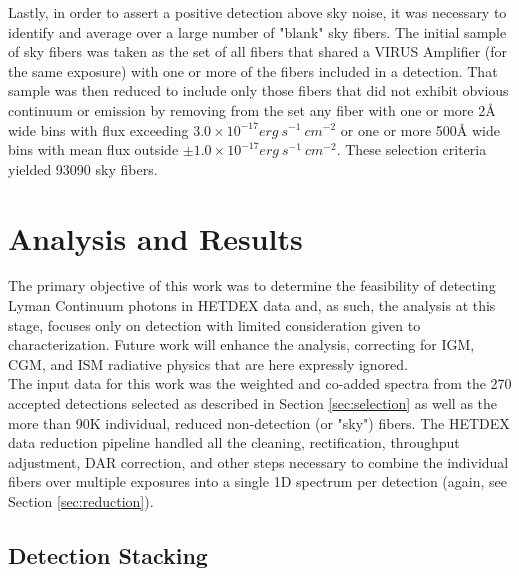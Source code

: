 \documentclass{aastex62}
\begin{document}
Lastly, in order to assert a positive detection above sky noise, it was necessary to identify and average over a large number of "blank" sky fibers. The initial sample of sky fibers was taken as the set of all fibers that shared a VIRUS Amplifier (for the same exposure) with one or more of the fibers included in a detection. That sample was then reduced to include only those fibers that did not exhibit obvious continuum or emission by removing from the set any fiber with one or more 2$\mbox{\AA}$ wide bins with flux exceeding $3.0\times 10^{-17} erg\ s^{-1}\ cm^{-2}$ or one or more 500$\mbox{\AA}$ wide bins with mean flux outside $\pm 1.0 \times 10^{-17} erg\ s^{-1}\ cm^{-2}$. These selection criteria yielded 93090 sky fibers.  \\

\section{Analysis and Results} \label{sec:analysis}

The primary objective of this work was to determine the feasibility of detecting Lyman Continuum photons in HETDEX data and, as such, the analysis at this stage, focuses only on detection with limited consideration given to characterization. Future work will enhance the analysis, correcting for IGM, CGM, and ISM radiative physics that are here expressly ignored.\\

The input data for this work was the weighted and co-added spectra from the 270 accepted detections selected as described in Section \ref{sec:selection} as well as the more than 90K individual, reduced non-detection (or "sky") fibers. The HETDEX data reduction pipeline handled all the cleaning, rectification, throughput adjustment, DAR correction, and other steps necessary to combine the individual fibers over multiple exposures into a single 1D spectrum per detection (again, see Section \ref{sec:reduction}).\\


\subsection{Detection Stacking}
\end{document}

